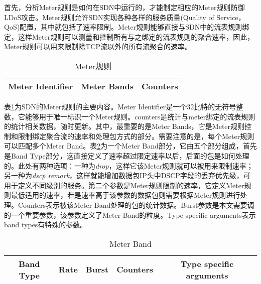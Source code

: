 首先，分析Meter规则是如何在SDN中运行的，才能制定相应的Meter规则防御LDoS攻击。Meter规则允许SDN实现各种各样的服务质量(Quality of Service，QoS)配置，其中就包括了速率限制。Meter规则能够直接与SDN中的流表规则绑定，这样Meter规则可以测量和控制所有与之绑定的流表规则的聚合速率，因此，Meter规则可以用来限制除TCP流以外的所有流聚合的速率。

\begin{table}[htbp]
	\centering  %
	\caption{Meter规则}  %
	\label{table:meter}  %
	\begin{tabular}{|c|c|c|}  
		\hline  %
        Meter Identifier & Meter Bands& Counters \\  %
        \hline
		
	\end{tabular}
\end{table}
表\ref{table:meter}为SDN的Meter规则的主要内容。Meter Identifier是一个32比特的无符号整数，它能够用于唯一标识一个Meter规则。counters是统计与meter绑定的流表规则的统计相关数据，随时更新。其中，最重要的是Meter Bands，它是Meter规则控制和限制绑定聚合流的速率和处理包方式的部分。需要注意的是，每个Meter规则可以匹配多个Meter Band。表\ref{table:meterbands}为一个Meter Band部分，它由五个部分组成，首先是Band Type部分，这直接定义了速率超过限定速率以后，后面的包是如何处理的。此处有两种选项：一种为\emph{drop}，这样它该Meter规则就可以被用来限制速率；另一种为\emph{dscp remark}，这样就能增加数据包IP头中DSCP字段的丢弃优先级，可用于定义不同级别的服务。第二个参数是Meter规则限制的速率，它定义Meter规则最低适用的速率，若是速率高于该参数的数据包则需要根据Meter规则进行处理。Counters表示被该Meter Band处理的包的统计数据。Burst参数是本文需要调的一个重要参数，该参数定义了Meter Band的粒度。Type specific arguments表示band types有特殊的参数。

\begin{table}[htbp]
	\centering  %
	\caption{Meter Band}  %
	\label{table:meterbands}  %
	\begin{tabular}{|c|c|c|c|c|}  
		\hline  %
        Band Type & Rate & Burst & Counters & Type specific arguments \\  %
        \hline
		
	\end{tabular}
\end{table}

